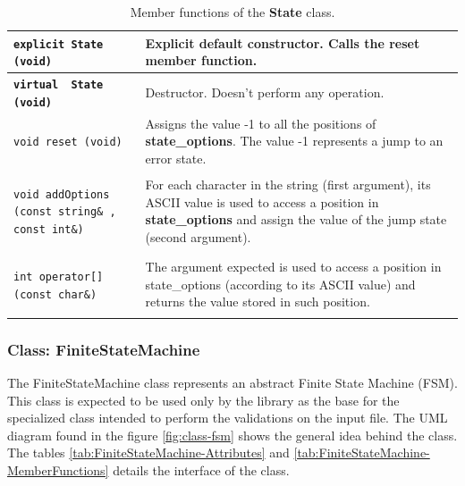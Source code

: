 \documentclass[11pt,twoside,openany,x11names,svgnames]{memoir}
\begin{document}
\begin{table}[h]\footnotesize
\centering
\begin{tabular}{| >{\bfseries}p{7.5cm} | p{8cm} |}
	\hline
	
	\texttt{explicit State (void)} & Explicit default constructor. Calls the \textbf{reset} member function. \\
	
	\hline
	
	\texttt{virtual ~State (void)} & Destructor. Doesn't perform any operation. \\
	
	\hline
	
	\texttt{void reset (void)} & Assigns the value -1 to all the positions of \textbf{state\_options}. The value -1 represents a jump to an error state. \\
	
	\hline 
	
	\texttt{void addOptions (const string\& , const int\&)} & For each character in the string (first argument), its ASCII value is used to access a position in \textbf{state\_options} and assign the value of the jump state (second argument). \\
	
	\hline
	
	\texttt{int operator[] (const char\&)} & The argument expected is used to access a position in state\_options (according to its ASCII value) and returns the value stored in such position. \\ 
	
	\hline
\end{tabular}
\caption{Member functions of the \textbf{State} class.}
\label{tab:State-MemberFunctions}
\end{table}

\newpage 

\subsubsection{Class: FiniteStateMachine}\label{Class-FiniteStateMachine}

The FiniteStateMachine class represents an abstract Finite State Machine (FSM). This class is expected to be used only by the library as the base for the specialized class intended to perform the validations on the input file. The UML diagram found in the figure \ref{fig:class-fsm} shows the general idea behind the class. The tables \ref{tab:FiniteStateMachine-Attributes} and \ref{tab:FiniteStateMachine-MemberFunctions} details the interface of the class.
\end{document}
